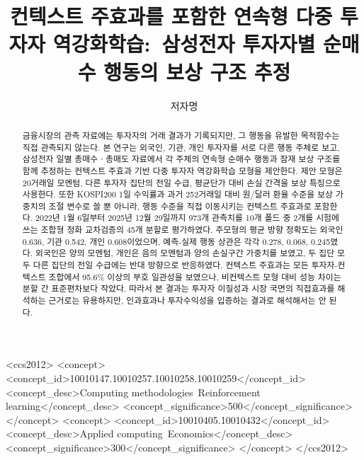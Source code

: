 \documentclass[sigconf,nonacm]{acmart}
\begin{document}
\title{컨텍스트 주효과를 포함한 연속형 다중 투자자 역강화학습:\
삼성전자 투자자별 순매수 행동의 보상 구조 추정}

\author{저자명}
\renewcommand{\shortauthors}{저자명}

\begin{abstract}
금융시장의 관측 자료에는 투자자의 거래 결과가 기록되지만, 그 행동을 유발한
목적함수는 직접 관측되지 않는다. 본 연구는 외국인, 기관, 개인 투자자를 서로 다른
행동 주체로 보고, 삼성전자 일별 총매수ㆍ총매도 자료에서 각 주체의 연속형 순매수
행동과 잠재 보상 구조를 함께 추정하는 컨텍스트 주효과 기반 다중 투자자
역강화학습 모형을 제안한다. 제안 모형은 20거래일 모멘텀, 다른 투자자 집단의 전일
수급, 평균단가 대비 손실 간격을 보상 특징으로 사용한다. 또한 KOSPI200 1일
수익률과 과거 252거래일 대비 원/달러 환율 수준을 보상 가중치의 조절 변수로 쓸
뿐 아니라, 행동 수준을 직접 이동시키는 컨텍스트 주효과로 포함한다. 2022년 1월
6일부터 2025년 12월 29일까지 973개 관측치를 10개 폴드 중 2개를 시험에 쓰는
조합형 정화 교차검증의 45개 분할로 평가하였다. 주모형의 평균 방향 정확도는
외국인 0.636, 기관 0.542, 개인 0.608이었으며, 예측-실제 행동 상관은 각각
0.278, 0.068, 0.245였다. 외국인은 양의 모멘텀, 개인은 음의 모멘텀과 양의
손실구간 가중치를 보였고, 두 집단 모두 다른 집단의 전일 수급에는 반대 방향으로
반응하였다. 컨텍스트 주효과는 모든 투자자-컨텍스트 조합에서 95.6\% 이상의 부호
일관성을 보였으나, 비컨텍스트 모형 대비 성능 차이는 분할 간 표준편차보다 작았다.
따라서 본 결과는 투자자 이질성과 시장 국면의 직접효과를 해석하는 근거로는
유용하지만, 인과효과나 투자수익성을 입증하는 결과로 해석해서는 안 된다.
\end{abstract}

\begin{CCSXML}
<ccs2012>
  <concept>
    <concept_id>10010147.10010257.10010258.10010259</concept_id>
    <concept_desc>Computing methodologies~Reinforcement learning</concept_desc>
    <concept_significance>500</concept_significance>
  </concept>
  <concept>
    <concept_id>10010405.10010432</concept_id>
    <concept_desc>Applied computing~Economics</concept_desc>
    <concept_significance>300</concept_significance>
  </concept>
</ccs2012>
\end{CCSXML}


\end{document}
